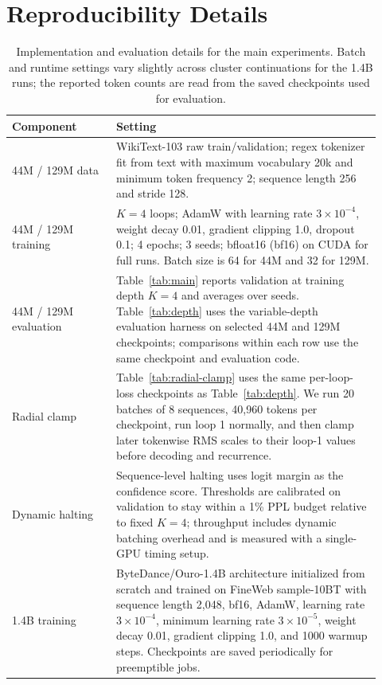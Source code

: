 \section{Reproducibility Details}
\label{app:repro}

\begin{table}[!htbp]
\centering
\small
\caption{Implementation and evaluation details for the main experiments. Batch and runtime settings vary slightly across cluster continuations for the 1.4B runs; the reported token counts are read from the saved checkpoints used for evaluation.}
\label{tab:repro}
\begin{tabular}{p{0.26\linewidth}p{0.66\linewidth}}
\toprule
\textbf{Component} & \textbf{Setting} \\
\midrule
44M / 129M data & WikiText-103 raw train/validation; regex tokenizer fit from text with maximum vocabulary 20k and minimum token frequency 2; sequence length 256 and stride 128. \\
44M / 129M training & $K=4$ loops; AdamW with learning rate $3{\times}10^{-4}$, weight decay 0.01, gradient clipping 1.0, dropout 0.1; 4 epochs; 3 seeds; bfloat16 (bf16) on CUDA for full runs. Batch size is 64 for 44M and 32 for 129M. \\
44M / 129M evaluation & Table~\ref{tab:main} reports validation at training depth $K=4$ and averages over seeds. Table~\ref{tab:depth} uses the variable-depth evaluation harness on selected 44M and 129M checkpoints; comparisons within each row use the same checkpoint and evaluation code. \\
Radial clamp & Table~\ref{tab:radial-clamp} uses the same per-loop-loss checkpoints as Table~\ref{tab:depth}. We run 20 batches of 8 sequences, 40{,}960 tokens per checkpoint, run loop 1 normally, and then clamp later tokenwise RMS scales to their loop-1 values before decoding and recurrence. \\
Dynamic halting & Sequence-level halting uses logit margin as the confidence score. Thresholds are calibrated on validation to stay within a 1\% PPL budget relative to fixed $K=4$; throughput includes dynamic batching overhead and is measured with a single-GPU timing setup. \\
1.4B training & ByteDance/Ouro-1.4B architecture initialized from scratch and trained on FineWeb sample-10BT with sequence length 2{,}048, bf16, AdamW, learning rate $3{\times}10^{-4}$, minimum learning rate $3{\times}10^{-5}$, weight decay 0.01, gradient clipping 1.0, and 1000 warmup steps. Checkpoints are saved periodically for preemptible jobs. \\

\end{tabular}
\end{table}
